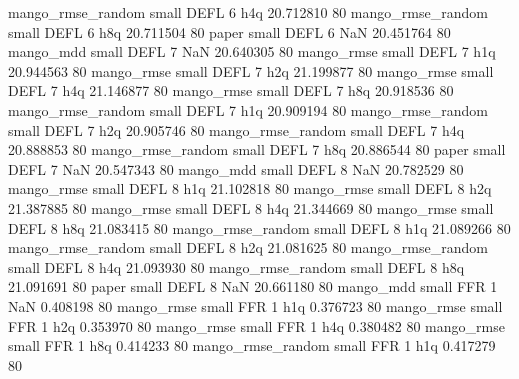 mango_rmse_random      small     DEFL                 6                  h4q 20.712810 80
mango_rmse_random      small     DEFL                 6                  h8q 20.711504 80
            paper      small     DEFL                 6                  NaN 20.451764 80
        mango_mdd      small     DEFL                 7                  NaN 20.640305 80
       mango_rmse      small     DEFL                 7                  h1q 20.944563 80
       mango_rmse      small     DEFL                 7                  h2q 21.199877 80
       mango_rmse      small     DEFL                 7                  h4q 21.146877 80
       mango_rmse      small     DEFL                 7                  h8q 20.918536 80
mango_rmse_random      small     DEFL                 7                  h1q 20.909194 80
mango_rmse_random      small     DEFL                 7                  h2q 20.905746 80
mango_rmse_random      small     DEFL                 7                  h4q 20.888853 80
mango_rmse_random      small     DEFL                 7                  h8q 20.886544 80
            paper      small     DEFL                 7                  NaN 20.547343 80
        mango_mdd      small     DEFL                 8                  NaN 20.782529 80
       mango_rmse      small     DEFL                 8                  h1q 21.102818 80
       mango_rmse      small     DEFL                 8                  h2q 21.387885 80
       mango_rmse      small     DEFL                 8                  h4q 21.344669 80
       mango_rmse      small     DEFL                 8                  h8q 21.083415 80
mango_rmse_random      small     DEFL                 8                  h1q 21.089266 80
mango_rmse_random      small     DEFL                 8                  h2q 21.081625 80
mango_rmse_random      small     DEFL                 8                  h4q 21.093930 80
mango_rmse_random      small     DEFL                 8                  h8q 21.091691 80
            paper      small     DEFL                 8                  NaN 20.661180 80
        mango_mdd      small      FFR                 1                  NaN  0.408198 80
       mango_rmse      small      FFR                 1                  h1q  0.376723 80
       mango_rmse      small      FFR                 1                  h2q  0.353970 80
       mango_rmse      small      FFR                 1                  h4q  0.380482 80
       mango_rmse      small      FFR                 1                  h8q  0.414233 80
mango_rmse_random      small      FFR                 1                  h1q  0.417279 80
